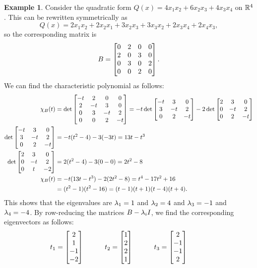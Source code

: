 \documentclass[reqno]{amsart}
\theoremstyle{definition}
\newtheorem{example}[theorem]{Example}
\begin{document}
\begin{example}\label{eg-quadratic-diag-ii}
 Consider the quadratic form $Q(x)=4x_1x_2+6x_2x_3+4x_3x_4$ on
 ${\mathbb{R}}^4$.  This can be rewritten symmetrically as
 \[ Q(x) =
     2x_1x_2 + 2x_2x_1 + 3x_2x_3 + 3 x_3x_2 + 2 x_3x_4 + 2x_4x_3,
 \]
 so the corresponding matrix is
 \[ B = \left[\begin{matrix} 0 & 2 & 0 & 0 \\
             2 & 0 & 3 & 0 \\
             0 & 3 & 0 & 2 \\
             0 & 0 & 2 & 0 \end{matrix}\right].
 \]
 We can find the characteristic polynomial as follows:
 \begin{align*}
  \chi_B(t) &=
   \det 
    \left[\begin{matrix} -t &  2 &  0 &  0 \\
          2 & -t &  3 &  0 \\
          0 &  3 & -t &  2 \\
          0 &  0 &  2 & -t \end{matrix}\right] 
   = 
   -t \det \left[\begin{matrix} -t & 3 & 0 \\ 3 & -t & 2 \\ 0 & 2 & -t \end{matrix}\right] 
   -2 \det \left[\begin{matrix} 2 & 3 & 0 \\ 0 & -t & 2 \\ 0 & 2 & -t \end{matrix}\right] \\
  \det \left[\begin{matrix} -t & 3 & 0 \\ 3 & -t & 2 \\ 0 & 2 & -t \end{matrix}\right] &=
   -t(t^2-4) - 3(-3t) = 13t - t^3 \\
  \det \left[\begin{matrix} 2 & 3 & 0 \\ 0 & -t & 2 \\ 0 & t & -2 \end{matrix}\right] &= 
   2(t^2-4) - 3(0-0) = 2t^2-8 \\
  \chi_B(t) &= -t(13t-t^3) -2(2t^2-8) = t^4-17t^2+16 \\
   &= (t^2-1)(t^2-16) = (t-1)(t+1)(t-4)(t+4).
 \end{align*}
 This shows that the eigenvalues are $\lambda_1=1$ and $\lambda_2=4$ and
 $\lambda_3=-1$ and $\lambda_4=-4$.  By row-reducing the matrices $B-\lambda_iI$,
 we find the corresponding eigenvectors as follows:
 \[ t_1 = \left[\begin{matrix}  2 \\  1 \\ -1 \\ -2 \end{matrix}\right] \hspace{3em}
    t_2 = \left[\begin{matrix}  1 \\  2 \\  2 \\  1 \end{matrix}\right] \hspace{3em}
    t_3 = \left[\begin{matrix}  2 \\ -1 \\ -1 \\  2 \end{matrix}\right] \hspace{3em}
\]
\end{example}
\end{document}
